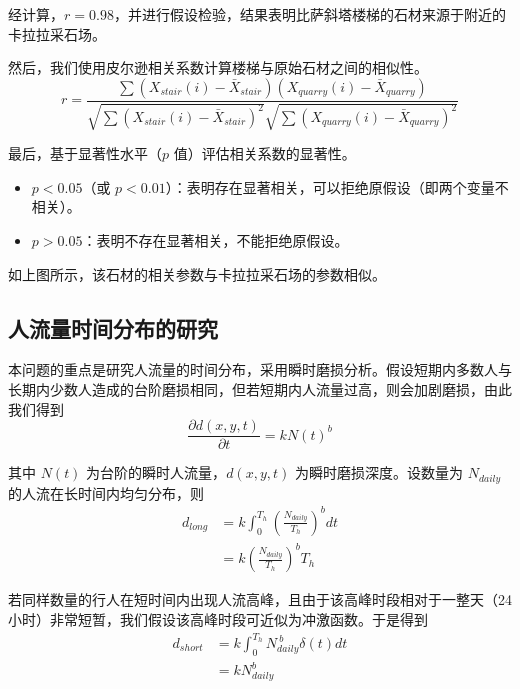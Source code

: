 \documentclass[11pt,a4paper]{ctexart}
\begin{document}
经计算，$r=0.98$，并进行假设检验，结果表明比萨斜塔楼梯的石材来源于附近的卡拉拉采石场。

然后，我们使用皮尔逊相关系数计算楼梯与原始石材之间的相似性。
\begin{equation}
r=\frac{\sum\left(X_{stair}(i)-\bar X_{stair}\right)\left(X_{quarry}(i)-\bar X_{quarry}\right)}{\sqrt{\sum\left(X_{stair}(i)-\bar X_{stair}\right)^2}\sqrt{\sum\left(X_{quarry}(i)-\bar X_{quarry}\right)^2}}\tag{19}
\end{equation}

最后，基于显著性水平（$p$ 值）评估相关系数的显著性。

\begin{itemize}[leftmargin=2em,itemsep=2pt,topsep=2pt]
\item $p<0.05$（或 $p<0.01$）：表明存在显著相关，可以拒绝原假设（即两个变量不相关）。
\item $p>0.05$：表明不存在显著相关，不能拒绝原假设。
\end{itemize}

如上图所示，该石材的相关参数与卡拉拉采石场的参数相似。

\subsection{人流量时间分布的研究}

本问题的重点是研究人流量的时间分布，采用瞬时磨损分析。假设短期内多数人与长期内少数人造成的台阶磨损相同，但若短期内人流量过高，则会加剧磨损，由此我们得到
\begin{equation}
\frac{\partial d(x,y,t)}{\partial t}=kN(t)^b\tag{20}
\end{equation}

其中 $N(t)$ 为台阶的瞬时人流量，$d(x,y,t)$ 为瞬时磨损深度。设数量为 $N_{daily}$ 的人流在长时间内均匀分布，则
\begin{equation}
\begin{aligned}
d_{long}&=k\int_0^{T_h}\left(\frac{N_{daily}}{T_h}\right)^bdt\\
&=k\left(\frac{N_{daily}}{T_h}\right)^bT_h
\end{aligned}\tag{21}
\end{equation}

若同样数量的行人在短时间内出现人流高峰，且由于该高峰时段相对于一整天（24 小时）非常短暂，我们假设该高峰时段可近似为冲激函数。于是得到
\begin{equation}
\begin{aligned}
d_{short}&=k\int_0^{T_h}N_{daily}^{\ b}\delta(t)dt\\
&=kN_{daily}^b
\end{aligned}\tag{22}
\end{equation}
\end{document}
